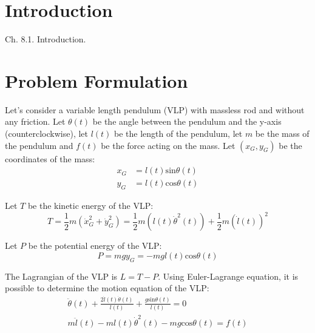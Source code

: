 \documentclass[a4paper]{article}
\begin{document}
\tableofcontents
\newpage



\section{Introduction}
Ch. 8.1.
Introduction\cite{Xin:2014:CDA:2584545}.

\section{Problem Formulation}
Let's consider a variable length pendulum (VLP) with massless rod and without any
friction. Let $\theta(t)$ be the angle between the pendulum and the y-axis
(counterclockwise), let $l(t)$ be the length of the pendulum, let $m$ be the mass of 
the pendulum and $f(t)$ be the force acting on the mass. Let $(x_G, y_G)$ be
the coordinates of the mass:
\begin{align}
  x_G &= l(t) \text{sin}\theta(t) \\
  y_G &= l(t) \text{cos}\theta(t)
\end{align}

Let $T$ be the kinetic energy of the VLP:
\begin{equation}
  T = \frac{1}{2} m ( \dot{x}_G^2 + \dot{y}_G^2 )
    = \frac{1}{2} m ( l(t) \dot{\theta}^2(t) ) + 
      \frac{1}{2} m ( \dot{l}(t) )^2
\end{equation}

Let $P$ be the potential energy of the VLP:
\begin{equation}
  P = m g y_G = -m g l(t) \text{cos}\theta(t)
\end{equation}

The Lagrangian of the VLP is $L = T - P$. Using Euler-Lagrange equation, it is 
possible to determine the motion equation of the VLP:
\begin{gather}
  \ddot{\theta}(t) + \frac{2 \dot{l}(t) \dot{\theta}(t)}{l(t)} +
    \frac{g \text{sin}\theta(t)}{l(t)} = 0 \\
  m \ddot{l}(t) - m l(t) \dot{\theta}^2(t) - mg\text{cos}\theta(t) = f(t)
\end{gather}
\end{document}
